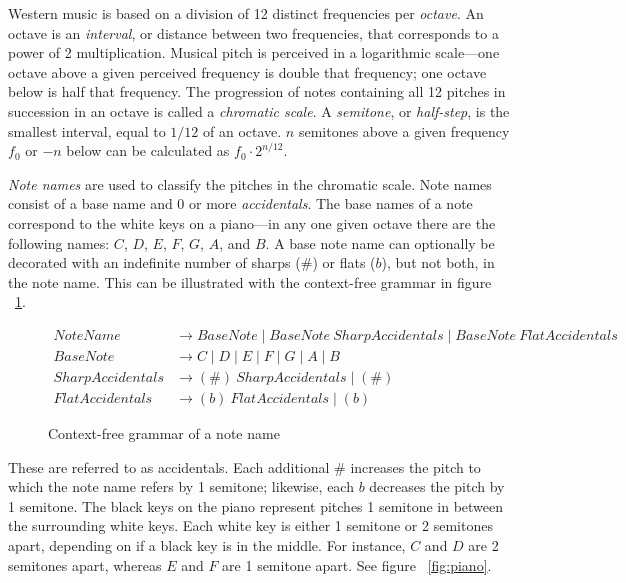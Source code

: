 Western music is based on a division of 12 distinct frequencies per \textit{octave}. An octave is an \textit{interval}, or distance between two frequencies, that corresponds to a power of 2 multiplication. Musical pitch is perceived in a logarithmic scale---one octave above a given perceived frequency is double that frequency; one octave below is half that frequency. The progression of notes containing all 12 pitches in succession in an octave is called a \textit{chromatic scale}. A \textit{semitone}, or \textit{half-step}, is the smallest interval, equal to $1/12$ of an octave. $n$ semitones above a given frequency $f_0$ or $-n$ below can be calculated as $f_0 \cdot 2^{n/12}$.

\textit{Note names} are used to classify the pitches in the chromatic scale. Note names consist of a base name and 0 or more \textit{accidentals}. The base names of a note correspond to the white keys on a piano---in any one given octave there are the following names: $C$, $D$, $E$, $F$, $G$, $A$, and $B$. A base note name can optionally be decorated with an indefinite number of sharps ($\#$) or flats ($b$), but not both, in the note name. This can be illustrated with the context-free grammar in figure ~\ref{fig:cfgnote}.

\begin{figure}[h!]
\begin{center}
\begin{align}
NoteName &\to BaseNote \mid BaseNote\ SharpAccidentals \mid BaseNote\ FlatAccidentals \\
BaseNote &\to C \mid D \mid E \mid F \mid G \mid A \mid B \\
SharpAccidentals &\to (\#)\ SharpAccidentals \mid (\#) \\
FlatAccidentals &\to (b)\ FlatAccidentals \mid (b)
\end{align}
\caption{Context-free grammar of a note name}
\label{fig:cfgnote}
\end{center}
\end{figure}


These are referred to as accidentals. Each additional $\#$ increases the pitch to which the note name refers by 1 semitone; likewise, each $b$ decreases the pitch by 1 semitone.  The black keys on the piano represent pitches 1 semitone in between the surrounding white keys. Each white key is either 1 semitone or 2 semitones apart, depending on if a black key is in the middle. For instance, $C$ and $D$ are 2 semitones apart, whereas $E$ and $F$ are 1 semitone apart. See figure ~\ref{fig:piano}.
